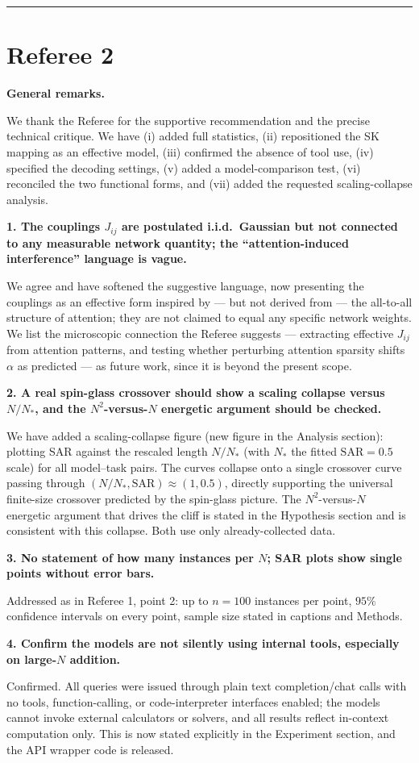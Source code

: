 \documentclass[11pt]{article}
\newcommand{\point}[1]{\medskip\noindent\textbf{#1}\par\nobreak}
\begin{document}
\bigskip\hrule\bigskip

\section{Referee 2}

\point{General remarks.}
We thank the Referee for the supportive recommendation and the precise technical critique. We
have (i) added full statistics, (ii) repositioned the SK mapping as an effective model, (iii)
confirmed the absence of tool use, (iv) specified the decoding settings, (v) added a
model-comparison test, (vi) reconciled the two functional forms, and (vii) added the requested
scaling-collapse analysis.

\point{1. The couplings $J_{ij}$ are postulated i.i.d.\ Gaussian but not connected to any
measurable network quantity; the ``attention-induced interference'' language is vague.}
We agree and have softened the suggestive language, now presenting the couplings as an effective
form inspired by --- but not derived from --- the all-to-all structure of attention; they are not
claimed to equal any specific network weights. We list the microscopic connection the Referee
suggests --- extracting effective $J_{ij}$ from attention patterns, and testing whether perturbing
attention sparsity shifts $\alpha$ as predicted --- as future work, since it is beyond the present
scope.

\point{2. A real spin-glass crossover should show a scaling collapse versus $N/N_*$, and the
$N^2$-versus-$N$ energetic argument should be checked.}
We have added a scaling-collapse figure (new figure in the Analysis section): plotting SAR
against the rescaled length $N/N_*$ (with $N_*$ the fitted $\mathrm{SAR}=0.5$ scale) for all
model--task pairs. The curves collapse onto a single crossover curve passing through
$(N/N_*,\mathrm{SAR})\approx(1,0.5)$, directly supporting the universal finite-size crossover
predicted by the spin-glass picture. The $N^2$-versus-$N$ energetic argument that drives the
cliff is stated in the Hypothesis section and is consistent with this collapse. Both use only
already-collected data.

\point{3. No statement of how many instances per $N$; SAR plots show single points without error
bars.}
Addressed as in Referee 1, point 2: up to $n=100$ instances per point, $95\%$ confidence
intervals on every point, sample size stated in captions and Methods.

\point{4. Confirm the models are not silently using internal tools, especially on large-$N$
addition.}
Confirmed. All queries were issued through plain text completion/chat calls with no tools,
function-calling, or code-interpreter interfaces enabled; the models cannot invoke external
calculators or solvers, and all results reflect in-context computation only. This is now stated
explicitly in the Experiment section, and the API wrapper code is released.
\end{document}
